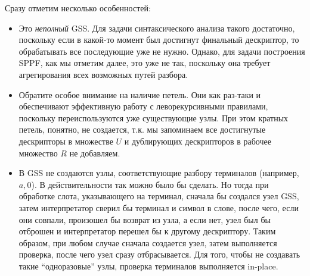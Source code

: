 \begin{example}
\begin{center}
\end{center}

	Сразу отметим несколько особенностей:
	
	\begin{itemize}
	  \item Это \textit{неполный} GSS. Для задачи синтаксического анализа такого достаточно, поскольку если в какой-то момент был достигнут финальный дескриптор, то обрабатывать все последующие уже не нужно. Однако, для задачи построения SPPF, как мы отметим далее, это уже не так, поскольку она требует агрегирования всех возможных путей разбора.
	
	  \item Обратите особое внимание на наличие петель. Они как раз-таки и обеспечивают эффективную работу с леворекурсивными правилами, поскольку переиспользуются уже существующие узлы. При этом кратных петель, понятно, не создается, т.к. мы запоминаем все достигнутые дескрипторы в множестве $ U $ и дублирующих дескрипторов в рабочее множество $ R $ не добавляем. 
	
    \item В GSS не создаются узлы, соответствующие разбору терминалов (например, $a, 0$). В действительности так можно было бы сделать. Но тогда при обработке слота, указывающего на терминал, сначала бы создался узел GSS, затем интерпретатор сверил бы терминал и символ в слове, после чего, если они совпали, произошел бы возврат из узла, а если нет, узел был бы отброшен и интерпретатор перешел бы к другому дескриптору. Таким образом, при любом случае сначала создается узел, затем выполняется проверка, после чего узел сразу отбрасывается. Для того, чтобы не создавать такие ``одноразовые'' узлы, проверка терминалов выполняется in-place.
	\end{itemize}
  

\end{example}
